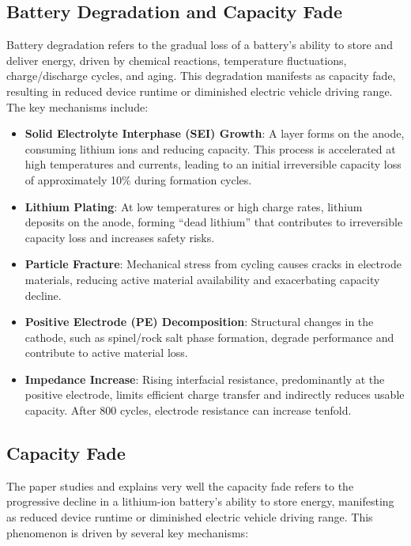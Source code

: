 \subsection{Battery Degradation and Capacity Fade}
Battery degradation refers to the gradual loss of a battery's ability to store and deliver energy, driven by chemical reactions, temperature fluctuations, charge/discharge cycles, and aging. This degradation manifests as capacity fade, resulting in reduced device runtime or diminished electric vehicle driving range. The key mechanisms include:

\begin{itemize}
    \item \textbf{Solid Electrolyte Interphase (SEI) Growth}: A layer forms on the anode, consuming lithium ions and reducing capacity. This process is accelerated at high temperatures and currents, leading to an initial irreversible capacity loss of approximately 10\% during formation cycles.
    \item \textbf{Lithium Plating}: At low temperatures or high charge rates, lithium deposits on the anode, forming ``dead lithium'' that contributes to irreversible capacity loss and increases safety risks.
    \item \textbf{Particle Fracture}: Mechanical stress from cycling causes cracks in electrode materials, reducing active material availability and exacerbating capacity decline.
    \item \textbf{Positive Electrode (PE) Decomposition}: Structural changes in the cathode, such as spinel/rock salt phase formation, degrade performance and contribute to active material loss.
    \item \textbf{Impedance Increase}: Rising interfacial resistance, predominantly at the positive electrode, limits efficient charge transfer and indirectly reduces usable capacity. After 800 cycles, electrode resistance can increase tenfold.
\end{itemize}

\subsection{Capacity Fade}
The \cite{zhang_studies_2000} paper studies and explains very well the capacity fade refers to the progressive decline in a lithium-ion battery’s ability to store energy, manifesting as reduced device runtime or diminished electric vehicle driving range. This phenomenon is driven by several key mechanisms:




